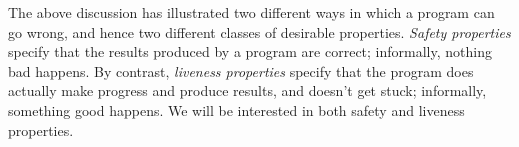 The above discussion has illustrated two different ways in which a program can
go wrong, and hence two different classes of desirable properties.
\emph{Safety properties} specify that the results produced by a
program are correct; informally, nothing bad happens.  By contrast,
\emph{liveness properties} specify that the program does
actually make progress and produce results, and doesn't get stuck; informally,
something good happens.  We will be interested in both safety and liveness
properties.









